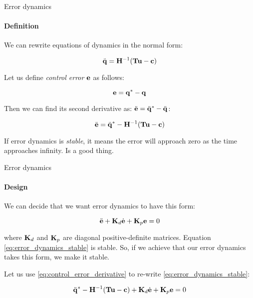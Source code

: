 \documentclass{beamer}
\begin{document}
\begin{frame}{Error dynamics}
\framesubtitle{Definition}
\begin{flushleft}

We can rewrite equations of dynamics in the normal form:

\begin{equation}
\label{eq:dynamics_normal}
\ddot{\mathbf{q}} = \mathbf{H}^{-1} (\mathbf{T}\mathbf{u} - \mathbf{c})
\end{equation}

Let us define \emph{control error} $\mathbf{e}$ as follows: 

\begin{equation}
\label{eq:control_error}
\mathbf{e} = \mathbf{q}^* - \mathbf{q}
\end{equation}

Then we can find its second derivative as: $\ddot{\mathbf{e}} = \ddot{\mathbf{q}}^* - \ddot{\mathbf{q}}$:

\begin{equation}
\label{eq:control_error_derivative}
\ddot{\mathbf{e}} = \ddot{\mathbf{q}}^* - \mathbf{H}^{-1} (\mathbf{T}\mathbf{u} - \mathbf{c})
\end{equation}

If error dynamics is \emph{stable}, it means the error will approach zero as the time approaches infinity. Is a good thing.

\end{flushleft}
\end{frame}



\begin{frame}{Error dynamics}
\framesubtitle{Design}
\begin{flushleft}

We can decide that we want error dynamics to have this form:

\begin{equation}
\label{eq:error_dynamics_stable}
\ddot{\mathbf{e}} + \mathbf{K}_d\dot{\mathbf{e}} + \mathbf{K}_p\mathbf{e} = 0
\end{equation}

where $\mathbf{K}_d$ and $\mathbf{K}_p$ are diagonal positive-definite matrices. Equation \eqref{eq:error_dynamics_stable} is stable. So, if we achieve that our error dynamics takes this form, we make it stable. 

\bigskip

Let us use \eqref{eq:control_error_derivative} to re-write \eqref{eq:error_dynamics_stable}:

\begin{equation}
\ddot{\mathbf{q}}^* - \mathbf{H}^{-1} (\mathbf{T}\mathbf{u} - \mathbf{c}) + \mathbf{K}_d\dot{\mathbf{e}} + \mathbf{K}_p\mathbf{e} = 0
\end{equation}

\end{flushleft}
\end{frame}
\end{document}
